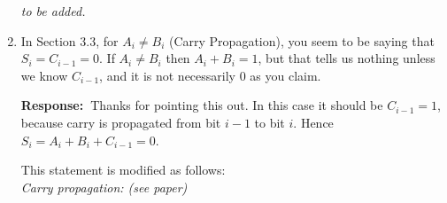 \documentclass[a4paper, 11pt]{article}
\def\Response{\noindent \textbf{Response:~}}
\newcommand{\Question}[1]{\textcolor[rgb]{0.51,0.00,0.00}{#1}}
\newcommand{\PaperText}[1]{\emph{#1}}
\begin{document}
\begin{enumerate}
      \PaperText{to be added.}\\
      
  \item \Question{In Section 3.3, for $A_i\neq B_i$ (Carry Propagation), you seem to be saying that $S_i = C_{i-1} = 0$.  If $A_i \neq B_i$ then $A_i + B_i = 1$, but that tells us nothing unless we know $C_{i-1}$, and it is not necessarily 0 as you claim.}
      
      \Response Thanks for pointing this out. In this case it should be $C_{i-1} =1$, because carry is propagated from bit $i-1$ to bit $i$. Hence $S_i=A_i+B_i+C_{i-1}=0$.
      
      This statement is modified as follows:\\
      
      \PaperText{Carry propagation: (see paper)}
      
  

      

\end{enumerate}
\end{document}
